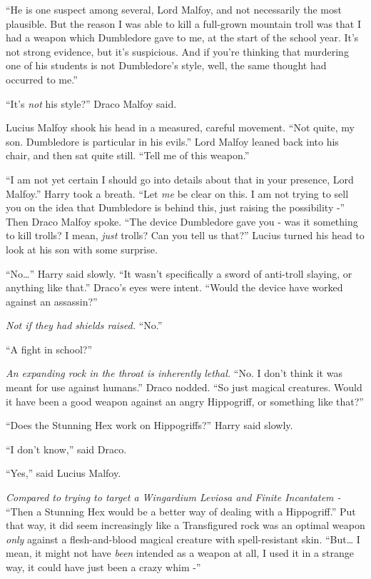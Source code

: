 ``He is one suspect among several, Lord Malfoy, and not necessarily the most plausible. But the reason I was able to kill a full-grown mountain troll was that I had a weapon which Dumbledore gave to me, at the start of the school year. It's not strong evidence, but it's suspicious. And if you're thinking that murdering one of his students is not Dumbledore's style, well, the same thought had occurred to me.''

``It's \emph{not} his style?'' Draco Malfoy said.

Lucius Malfoy shook his head in a measured, careful movement. ``Not quite, my son. Dumbledore is particular in his evils.'' Lord Malfoy leaned back into his chair, and then sat quite still. ``Tell me of this weapon.''

``I am not yet certain I should go into details about that in your presence, Lord Malfoy.'' Harry took a breath. ``Let \emph{me} be clear on this. I am not trying to sell you on the idea that Dumbledore is behind this, just raising the possibility -''
Then Draco Malfoy spoke. ``The device Dumbledore gave you - was it something to kill trolls? I mean, \emph{just} trolls? Can you tell us that?''
Lucius turned his head to look at his son with some surprise.

``No\ldots{}'' Harry said slowly. ``It wasn't specifically a sword of anti-troll slaying, or anything like that.''
Draco's eyes were intent. ``Would the device have worked against an assassin?''

\emph{Not if they had shields raised.} ``No.''

``A fight in school?''

\emph{An expanding rock in the throat is inherently lethal.} ``No. I don't think it was meant for use against humans.'' Draco nodded. ``So just magical creatures. Would it have been a good weapon against an angry Hippogriff, or something like that?''

``Does the Stunning Hex work on Hippogriffs?'' Harry said slowly.

``I don't know,'' said Draco.

``Yes,'' said Lucius Malfoy.

\emph{Compared to trying to target a Wingardium Leviosa and Finite Incantatem -} ``Then a Stunning Hex would be a better way of dealing with a Hippogriff.'' Put that way, it did seem increasingly like a Transfigured rock was an optimal weapon \emph{only} against a flesh-and-blood magical creature with spell-resistant skin. ``But\ldots{} I mean, it might not have \emph{been} intended as a weapon at all, I used it in a strange way, it could have just been a crazy whim
-''

